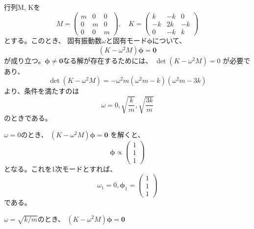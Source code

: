 \documentclass[a4paper]{jsarticle}
\begin{document}
\subsection{}
行列M, Kを
\begin{equation}
  M =
  \begin{pmatrix}
    m & 0 & 0 \\
    0 & m & 0 \\
    0 & 0 & m
  \end{pmatrix}, \quad
  K =
  \begin{pmatrix}
    k  & -k & 0  \\
    -k & 2k & -k \\
    0  & -k & k
  \end{pmatrix}
\end{equation}
とする。このとき、
固有振動数$\omega$と固有モード$\boldsymbol{\phi}$について、
\begin{equation}
  \left(K -\omega^2 M\right) \boldsymbol{\phi} = \boldsymbol{0}
\end{equation}
が成り立つ。$\boldsymbol{\phi} \neq \boldsymbol{0}$なる解が存在するためには、
$\det \left(K - \omega^2 M\right) = 0$
が必要であり、
\begin{equation}
  \det \left(K - \omega^2 M\right)
  = -\omega^2 m (\omega^2 m - k) (\omega^2 m - 3k)
\end{equation}
より、条件を満たすのは
\begin{equation}
  \omega = 0, \sqrt{\frac{k}{m}}, \sqrt{\frac{3k}{m}}
\end{equation}
のときである。\par
$\omega = 0$のとき、
$(K -\omega^2 M) \boldsymbol{\phi} = \boldsymbol{0}$
を解くと、
\begin{equation}
  \boldsymbol{\phi} \propto
  \begin{pmatrix}
    1 \\ 1 \\ 1
  \end{pmatrix}
\end{equation}
となる。これを1次モードとすれば、
\begin{equation}
  \omega_1 = 0, \boldsymbol{\phi}_1 =
  \begin{pmatrix}
    1 \\ 1 \\ 1
  \end{pmatrix}
\end{equation}
である。\par
$\omega = \sqrt{k/m}$のとき、
$(K -\omega^2 M) \boldsymbol{\phi} = \boldsymbol{0}$
\end{document}
